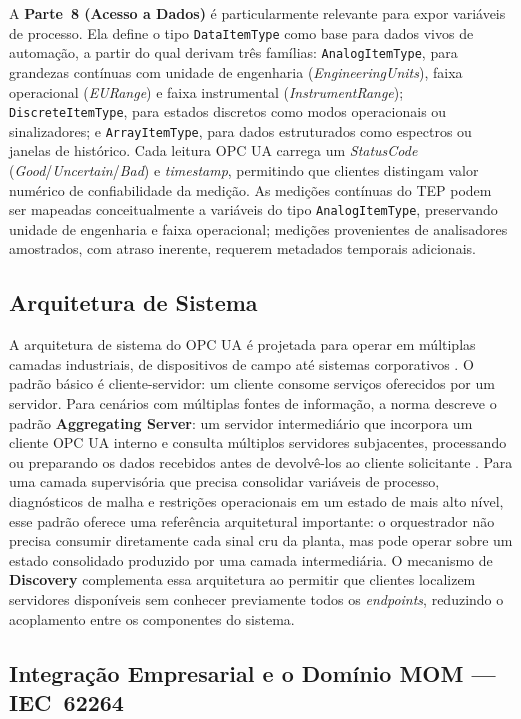 A \textbf{Parte~8 (Acesso a Dados)} \cite{IEC62541_8} é particularmente relevante para expor variáveis de processo. Ela define o tipo \texttt{DataItemType} como base para dados vivos de automação, a partir do qual derivam três famílias: \texttt{AnalogItemType}, para grandezas contínuas com unidade de engenharia (\textit{EngineeringUnits}), faixa operacional (\textit{EURange}) e faixa instrumental (\textit{InstrumentRange}); \texttt{DiscreteItemType}, para estados discretos como modos operacionais ou sinalizadores; e \texttt{ArrayItemType}, para dados estruturados como espectros ou janelas de histórico. Cada leitura OPC UA carrega um \textit{StatusCode} (\textit{Good}/\textit{Uncertain}/\textit{Bad}) e \textit{timestamp}, permitindo que clientes distingam valor numérico de confiabilidade da medição. As medições contínuas do TEP podem ser mapeadas conceitualmente a variáveis do tipo \texttt{AnalogItemType}, preservando unidade de engenharia e faixa operacional; medições provenientes de analisadores amostrados, com atraso inerente, requerem metadados temporais adicionais.

\subsection{Arquitetura de Sistema}

A arquitetura de sistema do OPC UA é projetada para operar em múltiplas camadas industriais, de dispositivos de campo até sistemas corporativos \cite{Mahnke2009arch}. O padrão básico é cliente-servidor: um cliente consome serviços oferecidos por um servidor. Para cenários com múltiplas fontes de informação, a norma descreve o padrão \textbf{Aggregating Server}: um servidor intermediário que incorpora um cliente OPC UA interno e consulta múltiplos servidores subjacentes, processando ou preparando os dados recebidos antes de devolvê-los ao cliente solicitante \cite{Mahnke2009arch}. Para uma camada supervisória que precisa consolidar variáveis de processo, diagnósticos de malha e restrições operacionais em um estado de mais alto nível, esse padrão oferece uma referência arquitetural importante: o orquestrador não precisa consumir diretamente cada sinal cru da planta, mas pode operar sobre um estado consolidado produzido por uma camada intermediária. O mecanismo de \textbf{Discovery} complementa essa arquitetura ao permitir que clientes localizem servidores disponíveis sem conhecer previamente todos os \textit{endpoints}, reduzindo o acoplamento entre os componentes do sistema.

\subsection{Integração Empresarial e o Domínio MOM --- IEC~62264}

